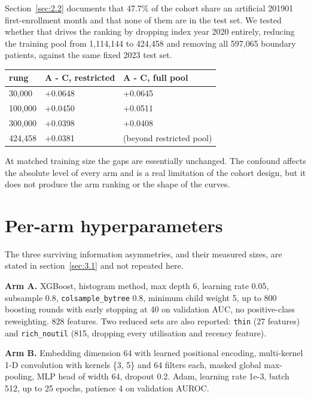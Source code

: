 \documentclass[10pt,twocolumn,letterpaper]{article}
\begin{document}
Section~\ref{sec:2.2} documents that 47.7\% of the cohort share an artificial 201901 first-enrollment month and that none of them are in the test set. We tested whether that drives the ranking by dropping index year 2020 entirely, reducing the training pool from 1,114,144 to 424,458 and removing all 597,065 boundary patients, against the same fixed 2023 test set.

\begin{table}[!ht]
\centering
\small
\label{tab:3}
\begin{tabular}{lll}
\toprule
rung & A - C, restricted & A - C, full pool \\
\midrule
30,000 & +0.0648 & +0.0645 \\
100,000 & +0.0450 & +0.0511 \\
300,000 & +0.0398 & +0.0408 \\
424,458 & +0.0381 & (beyond restricted pool) \\
\bottomrule
\end{tabular}
\end{table}



At matched training size the gaps are essentially unchanged. The confound affects the absolute level of every arm and is a real limitation of the cohort design, but it does not produce the arm ranking or the shape of the curves.







\section{Per-arm hyperparameters}



The three surviving information asymmetries, and their measured sizes, are stated in section~\ref{sec:3.1} and not repeated here.



\textbf{Arm A.} XGBoost, histogram method, max depth 6, learning rate 0.05, subsample 0.8, \texttt{colsample\_bytree} 0.8, minimum child weight 5, up to 800 boosting rounds with early stopping at 40 on validation AUC, no positive-class reweighting. 828 features. Two reduced sets are also reported: \texttt{thin} (27 features) and \texttt{rich\_noutil} (815, dropping every utilisation and recency feature).



\textbf{Arm B.} Embedding dimension 64 with learned positional encoding, multi-kernel 1-D convolution with kernels \{3, 5\} and 64 filters each, masked global max-pooling, MLP head of width 64, dropout 0.2. Adam, learning rate 1e-3, batch 512, up to 25 epochs, patience 4 on validation AUROC.
\end{document}
